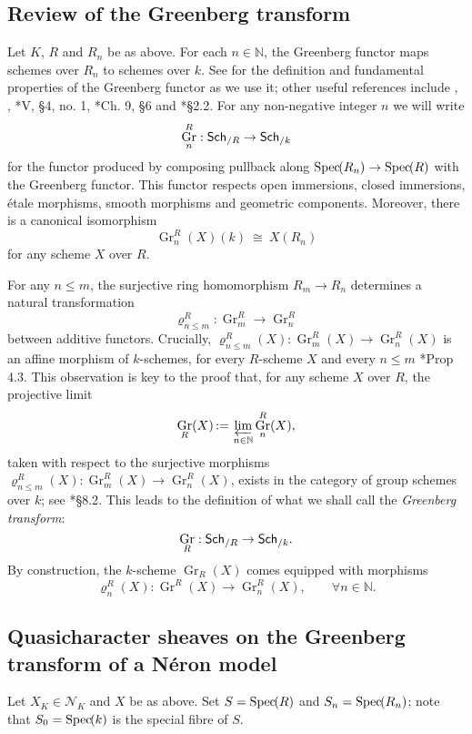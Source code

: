 \documentclass[10pt]{amsart}
\theoremstyle{plain}
\theoremstyle{definition}
\theoremstyle{remark}
\newcommand{\NN}{{\mathbb{N}}}
\newcommand{\Fq}{k}
\DeclareMathOperator{\Gr}{Gr}
\newcommand{\Spec}[1]{{\operatorname{Spec}\hskip-1pt( #1 )}}
\newcommand{\ceq}{{\, :=\, }}
\newcommand{\iso}{{\ \cong\ }}
\newcommand{\catname}[1]{\normalfont{\textsf{#1}}}
\newcommand{\Sch}[1]{{\catname{Sch}_{/#1}}}
\begin{document}
\subsection{Review of the Greenberg transform} \label{ssec:rev_Greenberg}

Let $K$, $R$ and $R_n$ be as above.
For each $n \in \NN$, the Greenberg functor maps schemes over $R_n$ to schemes over $\Fq$.
See \cite{bertrapelle-gonzales:Greenberg} for the definition and fundamental properties of the Greenberg functor as we use it; other useful references include
\cite{greenberg:61}, \cite{greenberg:63a},
\cite{demazure-gabriel:GroupesAlgebriques}*{V, \S 4, no. 1},
\cite{bosch-lutkebohmert-reynaud:NeronModels}*{Ch. 9, \S 6} and
\cite{nicaise-sebag:motivicSerre}*{\S 2.2}. %
%
For any non-negative integer $n$ we will write
\[
\Gr^R_n : \Sch{R} \to \Sch{\Fq}
\]
for the functor produced by composing pullback along $\Spec{R_n} \to \Spec{R}$ with the Greenberg functor. 
This functor respects open immersions, closed immersions, \'etale morphisms, smooth morphisms and geometric components.  Moreover, there is a canonical isomorphism
\[
\Gr^R_n(X)(\Fq) \iso X(R_n)
\]
for any scheme $X$ over $R$.

For any $n\leq m$,  the surjective ring homomorphism $R_{m} \to R_n$ determines a
natural transformation 
\[
\varrho^R_{n\leq m} : \Gr^R_{m} \to \Gr^R_n
\]
between additive functors.
Crucially, $\varrho^R_{n\leq m}(X): \Gr^R_{m}(X)\to \Gr^R_n(X)$ is an affine morphism of $\Fq$-schemes, for every $R$-scheme $X$ and every $n\leq m$ \cite{bertrapelle-gonzales:Greenberg}*{Prop 4.3}.
This observation is key to the proof that, for any scheme $X$ over $R$, the projective limit 
\[
\Gr_R(X) \ceq \varprojlim_{n\in \NN} \Gr^R_n(X),
\]
taken with respect to the surjective morphisms $\varrho^R_{n\leq m}(X) : \Gr^R_{m}(X) \to \Gr^R_n(X)$,
exists in the category of group schemes over $\Fq$;
see \cite{EGAIV3}*{\S 8.2}.
This leads to the definition of what we shall call the {\it Greenberg transform}:
\[
\Gr_R : \Sch{R} \to \Sch{\Fq}.
\]
By construction, the $\Fq$-scheme $\Gr_R(X)$ comes equipped with morphisms 
\[
\varrho^R_n(X) : \Gr^R(X) \to \Gr^R_n(X),\qquad \forall n\in \NN.
\]

\subsection{Quasicharacter sheaves on the Greenberg transform of a N\'eron model} \label{ssec:qc_on_GN}
 
Let $X_K \in \mathcal{N}_K$ and $X$ be as above.
Set $S = \Spec{R}$ and $S_n = \Spec{R_n}$;
note that $S_0 = \Spec{\Fq}$ is the special fibre of $S$.
\end{document}
